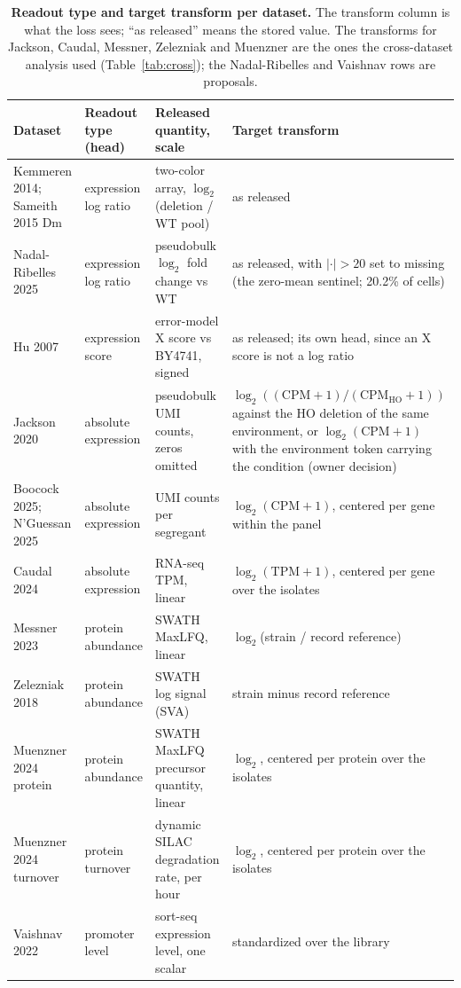 \begin{table}[htbp]
\centering
\scriptsize
\setlength{\tabcolsep}{3pt}
\caption[]{\textbf{Readout type and target transform per dataset.} The transform column is
what the loss sees; ``as released'' means the stored value. The transforms for Jackson,
Caudal, Messner, Zelezniak and Muenzner are the ones the cross-dataset analysis used
(Table~\ref{tab:cross}); the Nadal-Ribelles and Vaishnav rows are proposals.}
\label{tab:output-scales}
\begin{tabular}{>{\raggedright\arraybackslash}p{30mm}>{\raggedright\arraybackslash}p{30mm}>{\raggedright\arraybackslash}p{46mm}>{\raggedright\arraybackslash}p{62mm}}
\toprule
Dataset & Readout type (head) & Released quantity, scale & Target transform \\
\midrule
Kemmeren 2014; Sameith 2015 Dm & expression log ratio & two-color array, $\log_2$ (deletion / WT pool) & as released \\
Nadal-Ribelles 2025 & expression log ratio & pseudobulk $\log_2$ fold change vs WT & as released, with $|{\cdot}| > 20$ set to missing (the zero-mean sentinel; 20.2\% of cells) \\
Hu 2007 & expression score & error-model X score vs BY4741, signed & as released; its own head, since an X score is not a log ratio \\
Jackson 2020 & absolute expression & pseudobulk UMI counts, zeros omitted & $\log_2((\mathrm{CPM}+1)/(\mathrm{CPM}_{\mathrm{HO}}+1))$ against the HO deletion of the same environment, or $\log_2(\mathrm{CPM}+1)$ with the environment token carrying the condition (owner decision) \\
Boocock 2025; N'Guessan 2025 & absolute expression & UMI counts per segregant & $\log_2(\mathrm{CPM}+1)$, centered per gene within the panel \\
Caudal 2024 & absolute expression & RNA-seq TPM, linear & $\log_2(\mathrm{TPM}+1)$, centered per gene over the isolates \\
Messner 2023 & protein abundance & SWATH MaxLFQ, linear & $\log_2$(strain / record reference) \\
Zelezniak 2018 & protein abundance & SWATH log signal (SVA) & strain minus record reference \\
Muenzner 2024 protein & protein abundance & SWATH MaxLFQ precursor quantity, linear & $\log_2$, centered per protein over the isolates \\
Muenzner 2024 turnover & protein turnover & dynamic SILAC degradation rate, per hour & $\log_2$, centered per protein over the isolates \\
Vaishnav 2022 & promoter level & sort-seq expression level, one scalar & standardized over the library \\
\bottomrule
\end{tabular}
\end{table}

